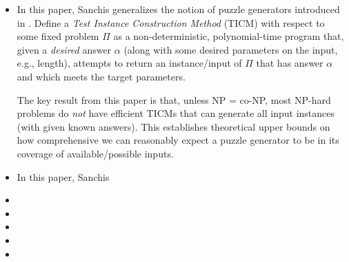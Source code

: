 \documentclass{extarticle}
\begin{document}
\begin{itemize}
  \item {}

    \begin{annotation}
      In this paper, Sanchis generalizes the notion of puzzle generators
      introduced in \textcite{language-instances}.  Define a \emph{Test
      Instance Construction Method} (TICM) with respect to some fixed problem
      \(\Pi\) as a non-deterministic, polynomial-time program that, given a
      \emph{desired} answer \(\alpha\) (along with some desired parameters on
      the input, e.g., length), attempts to return an instance/input of \(\Pi\)
      that has answer \(\alpha\) and which meets the target parameters.

      The key result from this paper is that, unless NP = co-NP, most NP-hard
      problems do \emph{not} have efficient TICMs that can generate all input
      instances (with given known answers).  This establishes theoretical upper
      bounds on how comprehensive we can reasonably expect a puzzle generator
      to be in its coverage of available/possible inputs.
    \end{annotation}

  \item {}

    \begin{annotation}
      In this paper, Sanchis
    \end{annotation}

  \item {}

  \item {}

  \item {}

  \item {}

  \item {}

\end{itemize}
\end{document}
